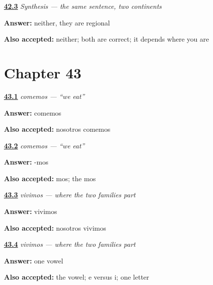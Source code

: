 \noindent\begin{minipage}[t]{\linewidth}
\raggedright
\hyperlink{review-ES-C07-sintesis-dos-continentes-which}{\textbf{42.3}} \emph{Synthesis — the same sentence, two continents}\par
\small \textbf{Answer:} neither, they are regional\par
\footnotesize \textbf{Also accepted:} neither; both are correct; it depends where you are
\end{minipage}\par\medskip

\section*{Chapter 43}

\noindent\begin{minipage}[t]{\linewidth}
\raggedright
\hyperlink{review-ES-C07-comemos-form}{\textbf{43.1}} \emph{comemos — \textquotedblleft{}we eat\textquotedblright{}}\par
\small \textbf{Answer:} comemos\par
\footnotesize \textbf{Also accepted:} nosotros comemos
\end{minipage}\par\medskip

\noindent\begin{minipage}[t]{\linewidth}
\raggedright
\hyperlink{review-ES-C07-comemos-part}{\textbf{43.2}} \emph{comemos — \textquotedblleft{}we eat\textquotedblright{}}\par
\small \textbf{Answer:} -mos\par
\footnotesize \textbf{Also accepted:} mos; the mos
\end{minipage}\par\medskip

\noindent\begin{minipage}[t]{\linewidth}
\raggedright
\hyperlink{review-ES-C07-vivimos-form}{\textbf{43.3}} \emph{vivimos — where the two families part}\par
\small \textbf{Answer:} vivimos\par
\footnotesize \textbf{Also accepted:} nosotros vivimos
\end{minipage}\par\medskip

\noindent\begin{minipage}[t]{\linewidth}
\raggedright
\hyperlink{review-ES-C07-vivimos-contrast}{\textbf{43.4}} \emph{vivimos — where the two families part}\par
\small \textbf{Answer:} one vowel\par
\footnotesize \textbf{Also accepted:} the vowel; e versus i; one letter
\end{minipage}\par\medskip

